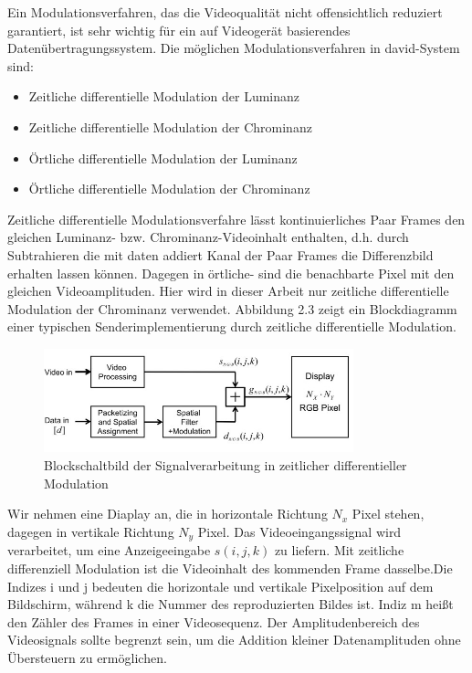 Ein Modulationsverfahren, das die Videoqualität nicht offensichtlich reduziert garantiert, ist sehr wichtig für ein auf Videogerät basierendes Datenübertragungssystem. Die möglichen Modulationsverfahren in \gls{david}-System sind:
\begin{itemize}
	\item Zeitliche differentielle Modulation der Luminanz
	\item Zeitliche differentielle Modulation der Chrominanz
	\item Örtliche differentielle Modulation der Luminanz
	\item Örtliche differentielle Modulation der Chrominanz
\end{itemize}

Zeitliche differentielle Modulationsverfahre lässt kontinuierliches Paar Frames den gleichen Luminanz- bzw. Chrominanz-Videoinhalt enthalten, d.h. durch Subtrahieren die mit daten addiert Kanal der Paar Frames die Differenzbild erhalten lassen können. Dagegen in örtliche- sind die benachbarte Pixel mit den gleichen Videoamplituden. Hier wird in dieser Arbeit nur zeitliche differentielle Modulation der Chrominanz verwendet. Abbildung 2.3 zeigt ein Blockdiagramm einer typischen Senderimplementierung durch zeitliche differentielle Modulation.

\begin{figure}[htb]
	\centering 
	\includegraphics[keepaspectratio,width=0.8\textwidth]{images/2_DaViD/David2.jpg}
	\caption{Blockschaltbild der Signalverarbeitung in zeitlicher differentieller Modulation}
	\label{fig:David3}
\end{figure}

Wir nehmen eine Diaplay an, die in horizontale Richtung $N_x$ Pixel stehen, dagegen in vertikale Richtung $N_y$ Pixel. Das Videoeingangssignal wird verarbeitet, um eine Anzeigeeingabe $s(i,j,k)$ zu liefern. Mit zeitliche differenziell Modulation ist die Videoinhalt des kommenden Frame dasselbe.Die Indizes i und j bedeuten die horizontale und vertikale Pixelposition auf dem Bildschirm, während k die Nummer des reproduzierten Bildes ist.
Indiz m heißt den Zähler des Frames in einer Videosequenz. Der Amplitudenbereich des Videosignals sollte begrenzt sein, um die Addition kleiner Datenamplituden ohne Übersteuern zu ermöglichen.

